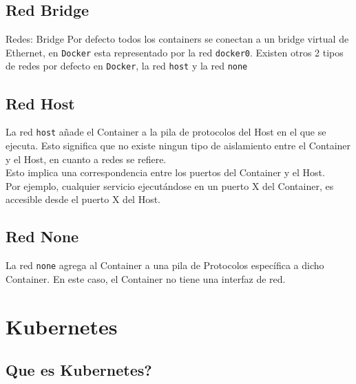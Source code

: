 \documentclass{beamer}
\begin{document}
\subsection{Red Bridge}
\begin{frame}{Redes: Bridge}
Por defecto todos los containers se conectan a un bridge virtual de Ethernet, en \texttt{Docker} esta representado por la red \texttt{docker0}. Existen otros 2 tipos de redes por defecto en \texttt{Docker}, la red \texttt{host} y la red \texttt{none}
\end{frame}

\subsection{Red Host}

\begin{frame}
\hspace{1cm} La red \texttt{host} añade el Container a la pila de protocolos del Host en el que se ejecuta. Esto significa que no existe ningun tipo de aislamiento entre el Container y el Host, en cuanto a redes se refiere.\\

\hspace{1cm} Esto implica una correspondencia entre los puertos del Container y el Host. \\

\hspace{1cm} Por ejemplo, cualquier servicio ejecutándose en un puerto X del Container, es accesible desde el puerto X del Host. 
\end{frame}

\subsection{Red None}

\begin{frame}
	La red \texttt{none} agrega al Container a una pila de Protocolos específica a dicho Container. En este caso, el Container no tiene una interfaz de red.
\end{frame}

\section{Kubernetes}

\subsection{Que es Kubernetes?}
\end{document}
